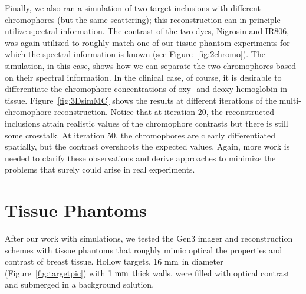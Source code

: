 Finally, we also ran a simulation of two target inclusions with different chromophores (but the same scattering); this reconstruction can in principle utilize spectral information. The contrast of the two dyes, Nigrosin and IR806, was again utilized to roughly match one of our tissue phantom experiments for which the spectral information is known (see Figure~\ref{fig:2chromo}). The simulation, in this case, shows how we can separate the two chromophores based on their spectral information. In the clinical case, of course, it is desirable to differentiate the chromophore concentrations of oxy- and deoxy-hemoglobin in tissue. Figure~\ref{fig:3DsimMC} shows the results at different iterations of the multi-chromophore reconstruction. Notice that at iteration 20, the reconstructed inclusions attain realistic values of the chromophore contrasts but there is still some crosstalk. At iteration 50, the chromophores are clearly differentiated spatially, but the contrast overshoots the expected values.  Again, more work is needed to clarify these observations and derive approaches to minimize the problems that surely could arise in real experiments.
%
\section{Tissue Phantoms}
After our work with simulations, we tested the Gen3 imager and reconstruction schemes with tissue phantoms that roughly mimic optical the properties and contrast of breast tissue. Hollow targets, $16~\rm{mm}$ in diameter (Figure~\ref{fig:targetpic}) with $1~\rm{mm}$ thick walls, were filled with optical contrast and submerged in a background solution.

